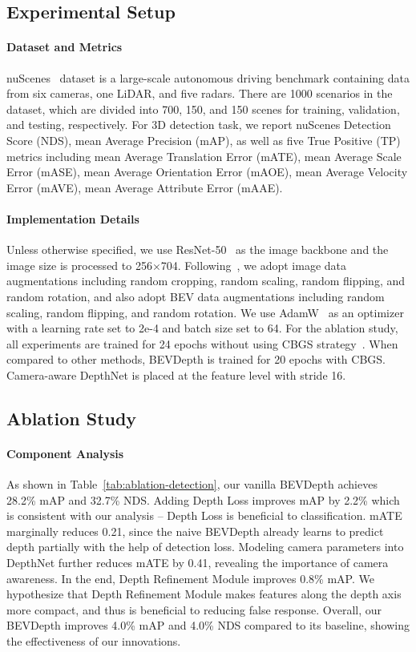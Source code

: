 \documentclass[twocolumn,letterpaper]{article}
\begin{document}
\subsection{Experimental Setup}

\paragraph{Dataset and Metrics} nuScenes~\cite{caesar2020nuscenes} dataset is a large-scale autonomous driving benchmark containing data from six cameras, one LiDAR, and five radars. There are 1000 scenarios in the dataset, which are divided into 700, 150, and 150 scenes for training, validation, and testing, respectively. For 3D detection task, we report nuScenes Detection Score (NDS), mean Average Precision (mAP), as well as five True Positive (TP) metrics including mean Average Translation Error (mATE), mean Average Scale Error (mASE), mean Average Orientation Error (mAOE), mean Average Velocity Error (mAVE), mean Average Attribute Error (mAAE).

\paragraph{Implementation Details} Unless otherwise specified, we use ResNet-50~\cite{resnet} as the image backbone and the image size is processed to 256$\times$704. Following~\cite{huang2021bevdet}, we adopt image data augmentations including random cropping, random scaling, random flipping, and random rotation, and also adopt BEV data augmentations including random scaling, random flipping, and random rotation. We use AdamW~\cite{adamw} as an optimizer with a learning rate set to 2e-4 and batch size set to 64. For the ablation study, all experiments are trained for 24 epochs without using CBGS strategy~\cite{zhu2019class}. When compared to other methods, BEVDepth is trained for 20 epochs with CBGS. Camera-aware DepthNet is placed at the feature level with stride 16.

\subsection{Ablation Study}\label{sec:4.2}

\paragraph{Component Analysis} As shown in Table~\ref{tab:ablation-detection}, our vanilla BEVDepth achieves 28.2\% mAP and 32.7\% NDS. Adding Depth Loss improves mAP by 2.2\% which is consistent with our analysis -- Depth Loss is beneficial to classification. mATE marginally reduces 0.21, since the naive BEVDepth already learns to predict depth partially with the help of detection loss. Modeling camera parameters into DepthNet further reduces mATE by 0.41, revealing the importance of camera awareness. In the end, Depth Refinement Module improves 0.8\% mAP. We hypothesize that Depth Refinement Module makes features along the depth axis more compact, and thus is beneficial to reducing false response. Overall, our BEVDepth improves 4.0\% mAP and 4.0\% NDS compared to its baseline, showing the effectiveness of our innovations.
\end{document}

